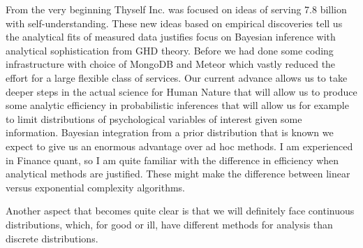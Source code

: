 \documentclass{amsart}
\begin{document}
From the very beginning Thyself Inc. was focused on ideas of serving 7.8 billion with self-understanding.  These new ideas based on empirical discoveries tell us the analytical fits of measured data justifies focus on Bayesian inference with analytical sophistication from GHD theory.  Before we had done some coding infrastructure with choice of MongoDB and Meteor which vastly reduced the effort for a large flexible class of services.  Our current advance allows us to take deeper steps in the actual science for Human Nature that will allow us to produce some analytic efficiency in probabilistic inferences that will allow us for example to limit distributions of psychological variables of interest given some information.  Bayesian integration from a prior distribution that is known we expect to give us an enormous advantage over ad hoc methods.  I am experienced in Finance quant, so I am quite familiar with the difference in efficiency when analytical methods are justified.  These might make the difference between linear versus exponential complexity algorithms.  

Another aspect that becomes quite clear is that we will definitely face continuous distributions, which, for good or ill, have different methods for analysis than discrete distributions.
\end{document}
